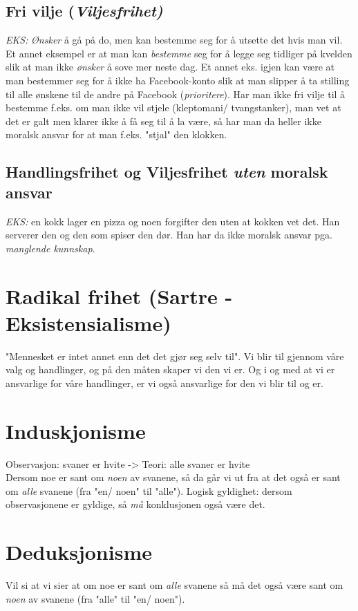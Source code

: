 \documentclass[11pt]{article}
\begin{document}
\subsection{Fri vilje (\emph{Viljesfrihet)}}
\emph{EKS:} \emph{Ønsker} å gå på do, men kan bestemme seg for å utsette det hvis man vil. Et annet eksempel er at man kan \emph{bestemme} seg for å legge seg tidliger på kvelden slik at man ikke \emph{ønsker} å sove mer neste dag.
Et annet eks. igjen kan være at man bestemmer seg for å ikke ha Facebook-konto slik at man slipper å ta stilling til alle ønskene til de andre på Facebook (\emph{prioritere}).
Har man ikke fri vilje til å bestemme f.eks. om man ikke vil stjele (kleptomani/ tvangstanker), man vet at det er galt men klarer ikke å få seg til å la være, så har man da heller ikke moralsk ansvar for at man f.eks. "stjal" den klokken.


\subsection{Handlingsfrihet og Viljesfrihet \emph{uten} moralsk ansvar}
\emph{EKS:} en kokk lager en pizza og noen forgifter den uten at kokken vet det. Han serverer den og den som spiser den dør. Han har da ikke moralsk ansvar pga. \emph{manglende kunnskap}.

\section{Radikal frihet (Sartre - Eksistensialisme)}
"Mennesket er intet annet enn det det gjør seg selv til".
Vi blir til gjennom våre valg og handlinger, og på den måten skaper vi den vi er. Og i og med at vi er ansvarlige for våre handlinger, er vi også ansvarlige for den vi blir til og er.

\section{Induskjonisme}
Observasjon: svaner er hvite -> Teori: alle svaner er hvite\\
Dersom noe er sant om \emph{noen} av svanene, så da går vi ut fra at det også er sant om \emph{alle} svanene (fra "en/ noen" til "alle").
Logisk gyldighet: dersom observasjonene er gyldige, så \emph{må} konklusjonen også være det.

\section{Deduksjonisme}
Vil si at vi sier at om noe er sant om \emph{alle} svanene så må det også være sant om \emph{noen} av svanene (fra "alle" til "en/ noen").
\end{document}
